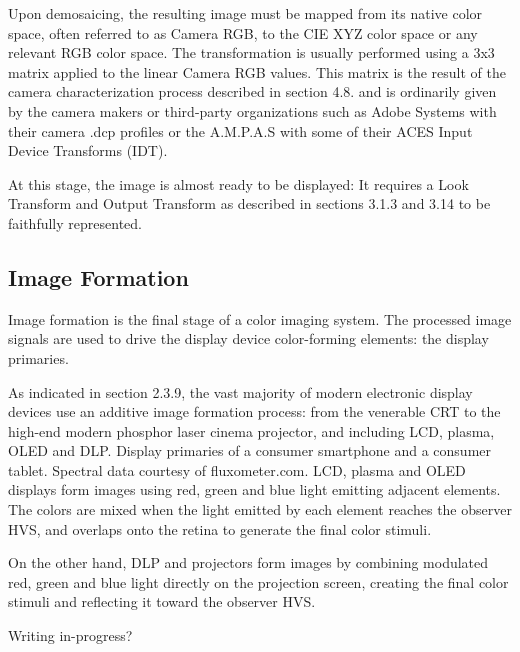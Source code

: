 Upon demosaicing, the resulting image must be mapped from its native color space, often referred to as Camera RGB, to the CIE XYZ color space or any relevant RGB color space. The transformation is usually performed using a 3x3 matrix applied to the linear Camera RGB values. This matrix is the result of the camera characterization process described in section 4.8. and is ordinarily given by the camera makers or third-party organizations such as Adobe Systems with their camera .dcp profiles or the A.M.P.A.S with some of their ACES Input Device Transforms (IDT).

At this stage, the image is almost ready to be displayed: It requires a Look Transform and Output Transform as described in sections 3.1.3 and 3.14 to be faithfully represented.

\subsection{Image Formation}%
\label{subsec:image-formation}

Image formation is the final stage of a color imaging system. The processed image signals are used to drive the display device color-forming elements: the display primaries.

As indicated in section 2.3.9, the vast majority of modern electronic display devices use an additive image formation process: from the venerable CRT to the high-end modern phosphor laser cinema projector, and including LCD, plasma, OLED and DLP.
Display primaries of a consumer smartphone and a consumer tablet. Spectral data courtesy of fluxometer.com.
LCD, plasma and OLED displays form images using red, green and blue light emitting adjacent elements. The colors are mixed when the light emitted by each element reaches the observer HVS, and overlaps onto the retina to generate the final color stimuli.

On the other hand, DLP and projectors form images by combining modulated red, green and blue light directly on the projection screen, creating the final color stimuli and reflecting it toward the observer HVS.

Writing in-progress?
